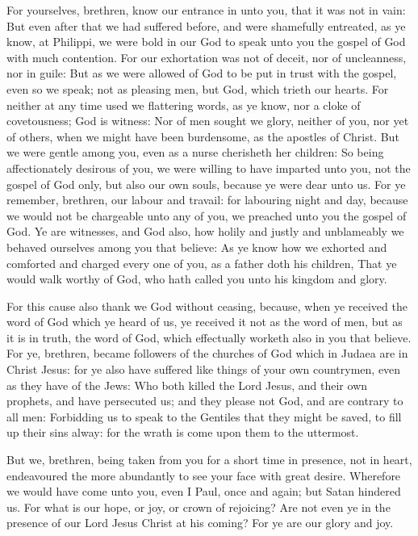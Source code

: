  For yourselves, brethren, know our entrance in unto you,
that it was not in vain:  But even after that we had
suffered before, and were shamefully entreated, as ye know, at Philippi,
we were bold in our God to speak unto you the gospel of God with much
contention.  For our exhortation was not of deceit, nor of
uncleanness, nor in guile:  But as we were allowed of God to
be put in trust with the gospel, even so we speak; not as pleasing men,
but God, which trieth our hearts.  For neither at any time
used we flattering words, as ye know, nor a cloke of covetousness; God
is witness:  Nor of men sought we glory, neither of you, nor
yet of others, when we might have been burdensome, as the apostles of
Christ.  But we were gentle among you, even as a nurse
cherisheth her children:  So being affectionately desirous
of you, we were willing to have imparted unto you, not the gospel of God
only, but also our own souls, because ye were dear unto us. 
For ye remember, brethren, our labour and travail: for labouring night
and day, because we would not be chargeable unto any of you, we preached
unto you the gospel of God.  Ye are witnesses, and God
also, how holily and justly and unblameably we behaved ourselves among
you that believe:  As ye know how we exhorted and comforted
and charged every one of you, as a father doth his children,
 That ye would walk worthy of God, who hath called you unto
his kingdom and glory.

 For this cause also thank we God without ceasing, because,
when ye received the word of God which ye heard of us, ye received it
not as the word of men, but as it is in truth, the word of God, which
effectually worketh also in you that believe.  For ye,
brethren, became followers of the churches of God which in Judaea are in
Christ Jesus: for ye also have suffered like things of your own
countrymen, even as they have of the Jews:  Who both killed
the Lord Jesus, and their own prophets, and have persecuted us; and they
please not God, and are contrary to all men:  Forbidding us
to speak to the Gentiles that they might be saved, to fill up their sins
alway: for the wrath is come upon them to the uttermost.

 But we, brethren, being taken from you for a short time in
presence, not in heart, endeavoured the more abundantly to see your face
with great desire.  Wherefore we would have come unto you,
even I Paul, once and again; but Satan hindered us.  For
what is our hope, or joy, or crown of rejoicing? Are not even ye in the
presence of our Lord Jesus Christ at his coming?  For ye
are our glory and joy.

